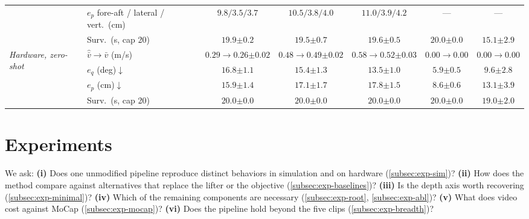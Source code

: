 \documentclass[letterpaper, 10 pt, conference]{ieeeconf}
\newcommand{\pmv}[2]{#1{\scriptstyle \pm #2}}
\begin{document}
\begin{table}[t!]
\begin{tabular*}{\linewidth}{@{\extracolsep{\fill}}llccccc@{}}
& $e_p$ fore-aft / lateral / vert.\ (cm) & $9.8/3.5/3.7$ & $10.5/3.8/4.0$ & $11.0/3.9/4.2$ & --- & --- \\
& Surv.\ (s, cap 20) & $\pmv{19.9}{0.2}$ & $\pmv{19.5}{0.7}$ & $\pmv{19.6}{0.5}$ & $\pmv{20.0}{0.0}$ & $\pmv{15.1}{2.9}$ \\
\midrule
\multirow{4}{2cm}{\textit{Hardware, zero-shot}}
& $\hat{\bar v}\to\bar v$ (m/s) & $0.29\to\pmv{0.26}{0.02}$ & $0.48\to\pmv{0.49}{0.02}$ & $0.58\to\pmv{0.52}{0.03}$ & $0.00\to0.00$ & $0.00\to0.00$ \\
& $e_q$ (deg)$\downarrow$ & $\pmv{16.8}{1.1}$ & $\pmv{15.4}{1.3}$ & $\pmv{13.5}{1.0}$ & $\pmv{5.9}{0.5}$ & $\pmv{9.6}{2.8}$ \\
& $e_p$ (cm)$\downarrow$ & $\pmv{15.9}{1.4}$ & $\pmv{17.1}{1.7}$ & $\pmv{17.8}{1.5}$ & $\pmv{8.6}{0.6}$ & $\pmv{13.1}{3.9}$ \\
& Surv.\ (s, cap 20) & $\pmv{20.0}{0.0}$ & $\pmv{20.0}{0.0}$ & $\pmv{20.0}{0.0}$ & $\pmv{20.0}{0.0}$ & $\pmv{19.0}{2.0}$ \\
\bottomrule
\end{tabular*}
\end{table}

\section{Experiments}\label{sec:experiments}
\noindent
We ask: \textbf{(i)} Does one unmodified pipeline reproduce distinct behaviors in simulation and on hardware (\autoref{subsec:exp-sim})? \textbf{(ii)} How does the method compare against alternatives that replace the lifter or the objective (\autoref{subsec:exp-baselines})? \textbf{(iii)} Is the depth axis worth recovering (\autoref{subsec:exp-minimal})? \textbf{(iv)} Which of the remaining components are necessary (\autoref{subsec:exp-root}, \autoref{subsec:exp-abl})? \textbf{(v)} What does video cost against MoCap (\autoref{subsec:exp-mocap})? \textbf{(vi)} Does the pipeline hold beyond the five clips (\autoref{subsec:exp-breadth})?
\end{document}
